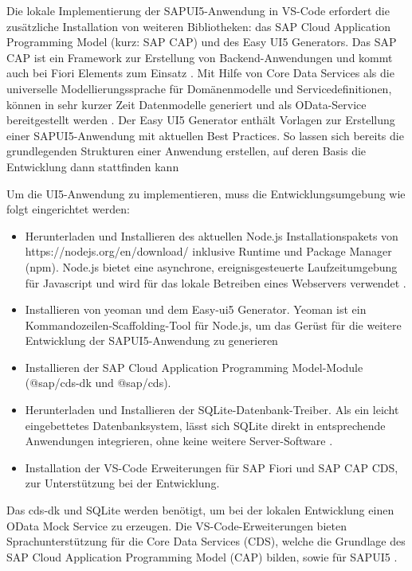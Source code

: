 Die lokale Implementierung der SAPUI5-Anwendung in VS-Code erfordert die zusätzliche Installation von weiteren Bibliotheken: das SAP Cloud Application Programming Model (kurz: SAP CAP) und des Easy UI5 Generators. Das SAP CAP ist ein Framework zur Erstellung von Backend-Anwendungen und kommt auch bei Fiori Elements zum Einsatz \cite{cap:ov}. Mit Hilfe von Core Data Services als die universelle Modellierungssprache für Domänenmodelle und Servicedefinitionen, können in sehr kurzer Zeit Datenmodelle generiert und als OData-Service bereitgestellt werden \cite{cap:ov}. Der Easy UI5 Generator enthält Vorlagen zur Erstellung einer SAPUI5-Anwendung mit aktuellen Best Practices. So lassen sich bereits die grundlegenden Strukturen einer Anwendung erstellen, auf deren Basis die Entwicklung dann stattfinden kann \cite{cap:geui5} 

Um die UI5-Anwendung zu implementieren, muss die Entwicklungsumgebung wie folgt eingerichtet werden:
\begin{itemize}[noitemsep]
\item Herunterladen und Installieren des aktuellen Node.js Installationspakets von https://nodejs.org/en/download/ inklusive Runtime und Package Manager (npm). Node.js bietet eine asynchrone, ereignisgesteuerte Laufzeitumgebung für Javascript und wird für das lokale Betreiben eines Webservers verwendet \cite{wiki:nodejs}.
\item Installieren von yeoman und dem Easy-ui5 Generator. Yeoman ist ein Kommandozeilen-Scaffolding-Tool für Node.js, um das Gerüst für die weitere Entwicklung der SAPUI5-Anwendung zu generieren 
\item Installieren der SAP Cloud Application Programming Model-Module (@sap/cds-dk und @sap/cds). 
\item Herunterladen und Installieren der SQLite-Datenbank-Treiber. Als ein leicht eingebettetes Datenbanksystem, lässt sich SQLite direkt in entsprechende Anwendungen integrieren, ohne keine weitere Server-Software \cite{wiki:sqlite}.
\item Installation der VS-Code Erweiterungen für SAP Fiori und SAP CAP CDS, zur Unterstützung bei der Entwicklung.
\end{itemize}

Das cds-dk und SQLite werden benötigt, um bei der lokalen Entwicklung einen OData Mock Service zu erzeugen. Die VS-Code-Erweiterungen bieten Sprachunterstützung für die Core Data Services (CDS), welche die Grundlage des SAP Cloud Application Programming Model (CAP) bilden, sowie für SAPUI5 \cite{vsc:cdsext}.

